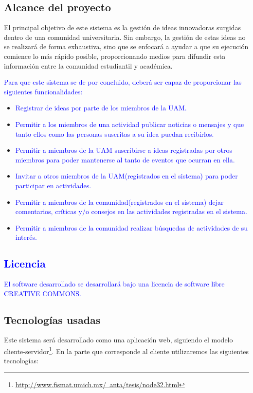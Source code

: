 \documentclass[11pt,letterpaper,titlepage]{article}
\begin{document}
\subsection{Alcance del proyecto}

El principal objetivo de este sistema es la gesti\'on de ideas innovadoras surgidas dentro de una comunidad universitaria. Sin embargo, la gesti\'on de estas ideas no se realizar\'a de forma exhaustiva, sino que se enfocar\'a a ayudar a que su ejecuci\'on comience lo m\'as r\'apido posible, proporcionando medios para difundir esta informaci\'on entre la comunidad estudiantil y acad\'emica. 

\textcolor{blue}{Para que este sistema se de por concluido, deber\'a ser capaz de proporcionar las siguientes funcionalidades:}

\begin{itemize}
 \item \textcolor{blue}{Registrar de ideas por parte de los miembros de la UAM.}
 \item \textcolor{blue}{Permitir a los miembros de una actividad publicar noticias o mensajes y que tanto ellos como las personas suscritas a su idea puedan recibirlos.}
 \item \textcolor{blue}{Permitir a miembros de la UAM suscribirse a ideas registradas por otros miembros para poder mantenerse al tanto de eventos que ocurran en ella.}
 \item \textcolor{blue}{Invitar a otros miembros de la UAM(registrados en el sistema) para poder participar en actividades.}
 \item \textcolor{blue}{Permitir a miembros de la comunidad(registrados en el sistema) dejar comentarios, cr\'iticas y/o consejos en las actividades registradas en el sistema.}
 \item \textcolor{blue}{Permitir a miembros de la comunidad realizar b\'usquedas de actividades de su inter\'es.}

\end{itemize}
\textcolor{blue}{
\subsection{Licencia}
El software desarrollado se desarrollar\'a bajo una licencia de software libre CREATIVE
COMMONS.}


\subsection{Tecnolog\'ias usadas}
Este sistema ser\'a desarrollado como una aplicaci\'on web, siguiendo el modelo cliente-servidor\footnote{\href{http://www.fismat.umich.mx/~anta/tesis/node32.html}{http://www.fismat.umich.mx/~anta/tesis/node32.html}}. En la parte que corresponde al cliente utilizaremos las siguientes tecnolog\'ias:
\end{document}
